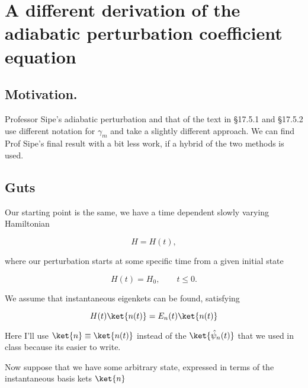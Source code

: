 
%

\chapter{A different derivation of the adiabatic perturbation coefficient equation}
\label{chap:adiabaticPertTakeII}
{}
\date{Oct 27, 2011}

\beginArtWithToc

\section{Motivation.}

Professor Sipe's adiabatic perturbation and that of the text \cite{desai2009quantum} in \S 17.5.1 and \S 17.5.2 use different notation for $\gamma_m$ and take a slightly different approach.  We can find Prof Sipe's final result with a bit less work, if a hybrid of the two methods is used.

\section{Guts}

Our starting point is the same, we have a time dependent slowly varying Hamiltonian 

\begin{equation}\label{eqn:adiabaticPertTakeII:10}
H = H(t),
\end{equation}

where our perturbation starts at some specific time from a given initial state

\begin{equation}\label{eqn:adiabaticPertTakeII:30}
H(t) = H_0, \qquad t \le 0.
\end{equation}

We assume that instantaneous eigenkets can be found, satisfying

\begin{equation}\label{eqn:adiabaticPertTakeII:50}
H(t) \ket{n(t)} = E_n(t) \ket{n(t)}
\end{equation}

Here I'll use $\ket{n} \equiv \ket{n(t)}$ instead of the $\ket{\hat{\psi}_n(t)}$ that we used in class because its easier to write.

Now suppose that we have some arbitrary state, expressed in terms of the instantaneous basis kets $\ket{n}$

